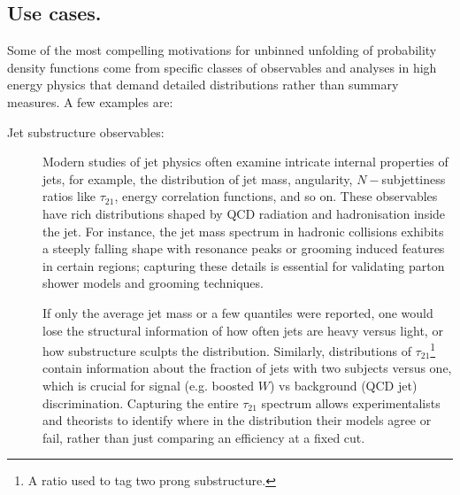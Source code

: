     \subsection{Use cases.}
    Some of the most compelling motivations for unbinned unfolding of probability density functions come from specific classes of observables and analyses in high energy physics that demand detailed distributions rather than summary measures.
    A few examples are:
    \begin{description}
        \item [Jet substructure observables:]
            Modern studies of jet physics often examine intricate internal properties of jets, for example, the distribution of jet mass, angularity, $N-$subjettiness ratios like $\tau_{21}$, energy correlation functions, and so on.
            These observables have rich distributions shaped by QCD radiation and hadronisation inside the jet.
            For instance, the jet mass spectrum in hadronic collisions exhibits a steeply falling shape with resonance peaks or grooming induced features in certain regions;
            capturing these details is essential for validating parton shower models and grooming techniques.

            If on\-ly the av\-er\-age jet mass or a few quant\-iles were re\-por\-ted, one wou\-ld lose the struc\-tur\-al in\-for\-ma\-tion of how often jets are hea\-vy ver\-sus light, or how sub\-struc\-ture sculpts the dis\-tri\-bu\-tion.
            Si\-mi\-lar\-ly, dis\-tri\-bu\-tions of \(\tau_{21}\)\footnote{A ratio used to tag two prong substructure.} contain information about the fraction of jets with two subjects versus one, which is crucial for signal (e.g. boosted $W$) vs background (QCD jet) discrimination.
            Capturing the entire $\tau_{21}$ spectrum allows experimentalists and theorists to identify where in the distribution their models agree or fail, rather than just comparing an efficiency at a fixed cut.
            

\end{description}
